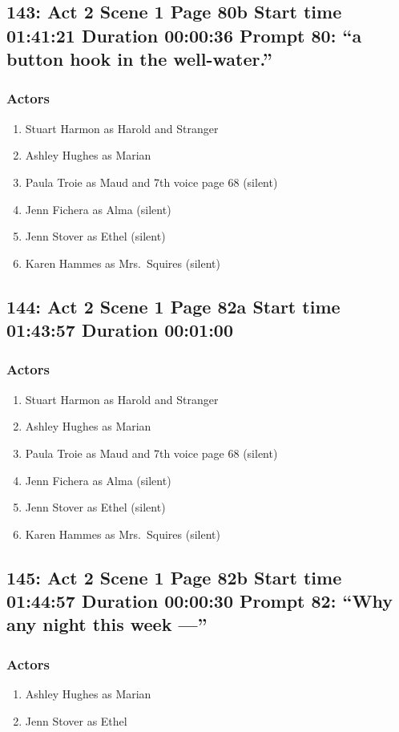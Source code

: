 \subsection{143: Act 2 Scene 1 Page 80b Start time 01:41:21 Duration 00:00:36 Prompt 80: ``a button hook in the well-water.''}

\subsubsection{Actors}
\begin{enumerate}
\item Stuart Harmon as Harold and Stranger
\item Ashley Hughes as Marian
\item Paula Troie as Maud and 7th voice page 68 (silent)
\item Jenn Fichera as Alma (silent)
\item Jenn Stover as Ethel (silent)
\item Karen Hammes as Mrs.~Squires (silent)
\end{enumerate}


\subsection{144: Act 2 Scene 1 Page 82a Start time 01:43:57 Duration 00:01:00}

\subsubsection{Actors}
\begin{enumerate}
\item Stuart Harmon as Harold and Stranger
\item Ashley Hughes as Marian
\item Paula Troie as Maud and 7th voice page 68 (silent)
\item Jenn Fichera as Alma (silent)
\item Jenn Stover as Ethel (silent)
\item Karen Hammes as Mrs.~Squires (silent)
\end{enumerate}


\subsection{145: Act 2 Scene 1 Page 82b Start time 01:44:57 Duration 00:00:30 Prompt 82: ``Why any night this week ---''}

\subsubsection{Actors}
\begin{enumerate}
\item Ashley Hughes as Marian
\item Jenn Stover as Ethel
\end{enumerate}
